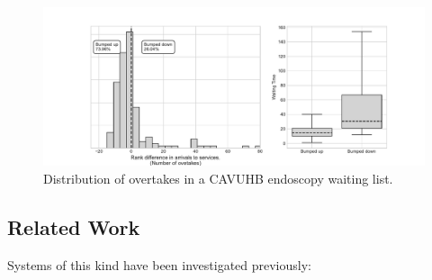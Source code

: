 \documentclass{article}
\begin{document}
\begin{figure}
  \begin{center}
    \includegraphics[width=\textwidth]{img/motivating_overtakes.pdf}
  \end{center}
  \caption{Distribution of overtakes in a CAVUHB endoscopy waiting list.}
  \label{fig:motivating_overtakes}
\end{figure}

\subsection{Related Work}\label{sec:related}
Systems of this kind have been investigated previously:
\end{document}
